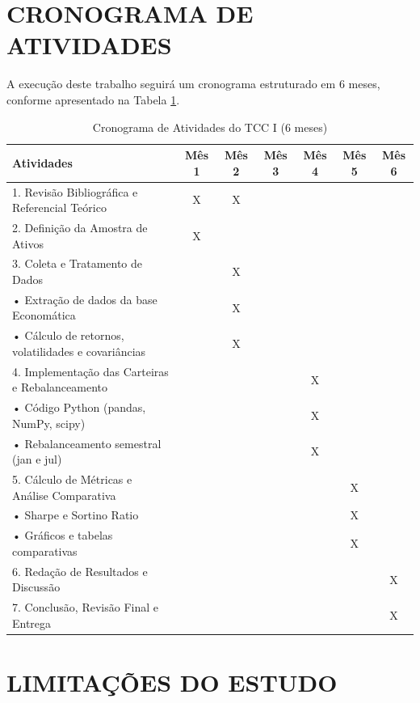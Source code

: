 \section{CRONOGRAMA DE ATIVIDADES}

A execução deste trabalho seguirá um cronograma estruturado em 6 meses, conforme apresentado na Tabela \ref{tab:cronograma}.

\begin{table}[h]
\centering
\caption{Cronograma de Atividades do TCC I (6 meses)}
\begin{tabular}{|p{5cm}|c|c|c|c|c|c|}
\hline
\textbf{Atividades} & \textbf{Mês 1} & \textbf{Mês 2} & \textbf{Mês 3} & \textbf{Mês 4} & \textbf{Mês 5} & \textbf{Mês 6} \\
\hline
1. Revisão Bibliográfica e Referencial Teórico & X & X & & & & \\
\hline
2. Definição da Amostra de Ativos & X & & & & & \\
\hline
3. Coleta e Tratamento de Dados & & X & & & & \\
\hline
\quad • Extração de dados da base Economática & & X & & & & \\
\hline
\quad • Cálculo de retornos, volatilidades e covariâncias & & X & & & & \\
\hline
4. Implementação das Carteiras e Rebalanceamento & & & & X & & \\
\hline
\quad • Código Python (pandas, NumPy, scipy) & & & & X & & \\
\hline
\quad • Rebalanceamento semestral (jan e jul) & & & & X & & \\
\hline
5. Cálculo de Métricas e Análise Comparativa & & & & & X & \\
\hline
\quad • Sharpe e Sortino Ratio & & & & & X & \\
\hline
\quad • Gráficos e tabelas comparativas & & & & & X & \\
\hline
6. Redação de Resultados e Discussão & & & & & & X \\
\hline
7. Conclusão, Revisão Final e Entrega & & & & & & X \\
\hline
\end{tabular}
\label{tab:cronograma}
\end{table}

\section{LIMITAÇÕES DO ESTUDO}

